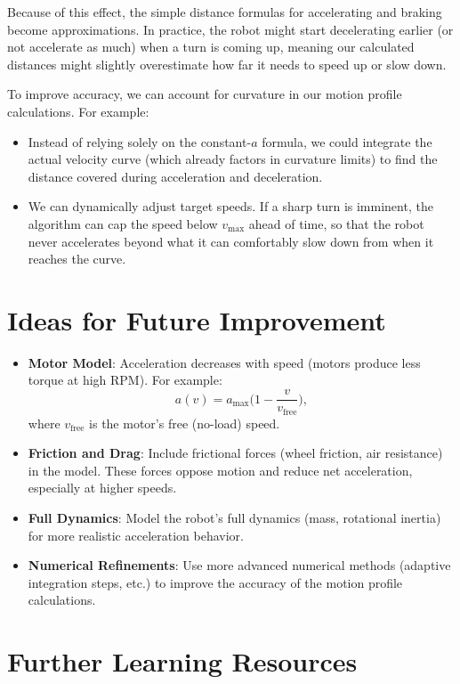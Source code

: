 \documentclass[11pt]{article}
\begin{document}
Because of this effect, the simple distance formulas for accelerating and braking become approximations. In practice, the robot might start decelerating earlier (or not accelerate as much) when a turn is coming up, meaning our calculated distances might slightly overestimate how far it needs to speed up or slow down.

To improve accuracy, we can account for curvature in our motion profile calculations. For example:
\begin{itemize}
  \item Instead of relying solely on the constant-$a$ formula, we could integrate the actual velocity curve (which already factors in curvature limits) to find the distance covered during acceleration and deceleration.
  \item We can dynamically adjust target speeds. If a sharp turn is imminent, the algorithm can cap the speed below $v_{\max}$ ahead of time, so that the robot never accelerates beyond what it can comfortably slow down from when it reaches the curve.
\end{itemize}

\section{Ideas for Future Improvement}

\begin{itemize}
  \item \textbf{Motor Model}: Acceleration decreases with speed (motors produce less torque at high RPM). For example:
  \[
    a(v) = a_{\text{max}}\Big(1 - \frac{v}{v_{\text{free}}}\Big),
  \]
  where $v_{\text{free}}$ is the motor’s free (no-load) speed.
  \item \textbf{Friction and Drag}: Include frictional forces (wheel friction, air resistance) in the model. These forces oppose motion and reduce net acceleration, especially at higher speeds.
  \item \textbf{Full Dynamics}: Model the robot’s full dynamics (mass, rotational inertia) for more realistic acceleration behavior.
  \item \textbf{Numerical Refinements}: Use more advanced numerical methods (adaptive integration steps, etc.) to improve the accuracy of the motion profile calculations.
\end{itemize}

\section{Further Learning Resources}
\end{document}
